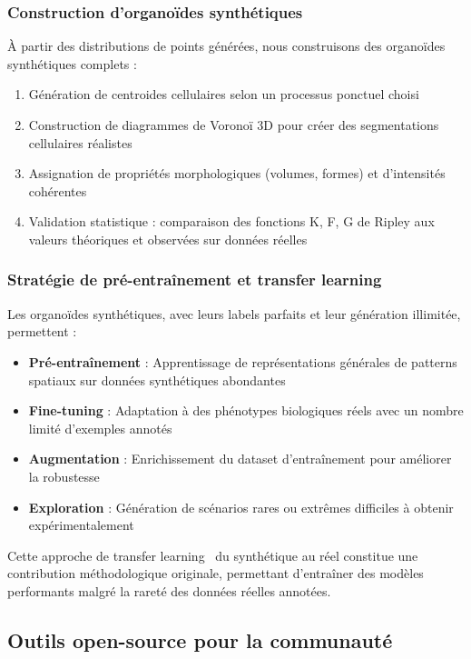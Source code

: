\subsubsection{Construction d'organoïdes synthétiques}

À partir des distributions de points générées, nous construisons des organoïdes synthétiques complets :
\begin{enumerate}
    \item Génération de centroides cellulaires selon un processus ponctuel choisi
    \item Construction de diagrammes de Voronoï 3D pour créer des segmentations cellulaires réalistes
    \item Assignation de propriétés morphologiques (volumes, formes) et d'intensités cohérentes
    \item Validation statistique : comparaison des fonctions K, F, G de Ripley aux valeurs théoriques et observées sur données réelles
\end{enumerate}

\subsubsection{Stratégie de pré-entraînement et transfer learning}

Les organoïdes synthétiques, avec leurs labels parfaits et leur génération illimitée, permettent :
\begin{itemize}
    \item \textbf{Pré-entraînement} : Apprentissage de représentations générales de patterns spatiaux sur données synthétiques abondantes
    \item \textbf{Fine-tuning} : Adaptation à des phénotypes biologiques réels avec un nombre limité d'exemples annotés
    \item \textbf{Augmentation} : Enrichissement du dataset d'entraînement pour améliorer la robustesse
    \item \textbf{Exploration} : Génération de scénarios rares ou extrêmes difficiles à obtenir expérimentalement
\end{itemize}

Cette approche de transfer learning~\cite{Pan2010,Weiss2016} du synthétique au réel constitue une contribution méthodologique originale, permettant d'entraîner des modèles performants malgré la rareté des données réelles annotées.

\subsection{Outils open-source pour la communauté}

